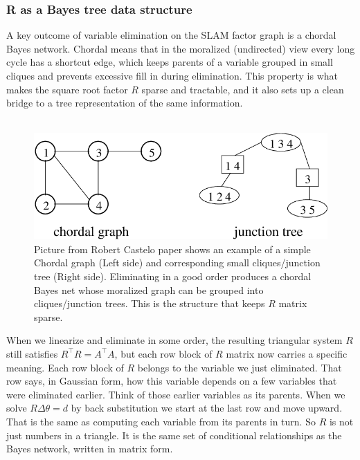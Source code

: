 \subsubsection{R as a Bayes tree data structure}
A key outcome of variable elimination on the \gls{SLAM} factor graph is a chordal Bayes network. Chordal means that in the moralized (undirected) view every long cycle has a shortcut edge, which keeps parents of a variable grouped in small cliques and prevents excessive fill in during elimination. This property is what makes the square root factor $R$ sparse and tractable, and it also sets up a clean bridge to a tree representation of the same information. \cite{iSAM2_paper,Bayes_tree_for_SLAM_paper}
\\ \\
\begin{figure}[H]
    \centering
    \includegraphics[width=0.98\linewidth]{Pictures/Optimizers/iSAM2/chodar_graph_to_junction_tree_example.png}
    \caption{Picture from Robert Castelo paper \cite{chordal_graph_to_junction_tree_paper} shows an example of a simple Chordal graph (Left side) and corresponding small cliques/junction tree (Right side). Eliminating in a good order produces a chordal Bayes net whose moralized graph can be grouped into cliques/junction trees. This is the structure that keeps $R$ matrix sparse.}
    \label{fig:optimizer-iSAM2-chordal}
\end{figure}
\noindent
When we linearize and eliminate in some order, the resulting triangular system $R$ still satisfies $R^\top R = A^\top A$, but each row block of $R$ matrix now carries a specific meaning. Each row block of $R$ belongs to the variable we just eliminated. That row says, in Gaussian form, how this variable depends on a few variables that were eliminated earlier. Think of those earlier variables as its parents. When we solve $R\Delta\theta=d$ by back substitution we start at the last row and move upward. That is the same as computing each variable from its parents in turn. So $R$ is not just numbers in a triangle. It is the same set of conditional relationships as the Bayes network, written in matrix form.
